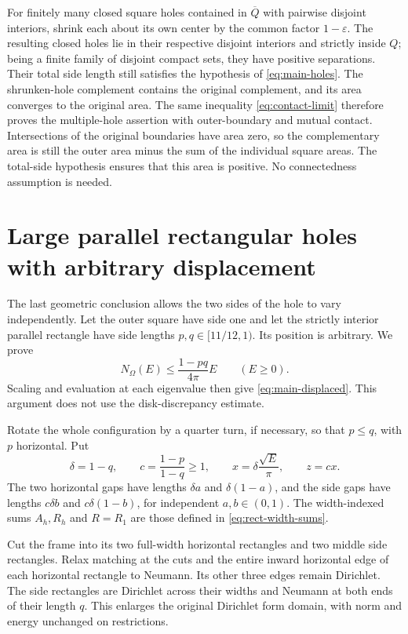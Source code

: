 \documentclass[11pt,reqno]{amsart}
\numberwithin{equation}{section}
\newcommand{\Om}{\Omega}
\begin{document}
For finitely many closed square holes contained in $\overline Q$
with pairwise disjoint interiors, shrink each about its own center
by the common factor $1-\varepsilon$. The resulting closed holes
lie in their respective disjoint interiors and strictly inside $Q$;
being a finite family of disjoint compact sets, they have positive
separations. Their total side length still satisfies the hypothesis
of \eqref{eq:main-holes}. The shrunken-hole complement contains the
original complement, and its area converges to the original area.
The same inequality \eqref{eq:contact-limit} therefore proves the
multiple-hole assertion with outer-boundary and mutual contact.
Intersections of the original boundaries have area zero, so the
complementary area is still the outer area minus the sum of the
individual square areas. The total-side hypothesis ensures that this
area is positive. No connectedness assumption is needed.


\section{Large parallel rectangular holes with arbitrary displacement}\label{sec:displaced}

The last geometric conclusion allows the two sides of the hole to vary
independently. Let the outer square have side one and let the strictly
interior parallel rectangle have side lengths $p,q\in[11/12,1)$.
Its position is arbitrary. We prove
\[
 N_\Om(E)\le\frac{1-pq}{4\pi}E\qquad(E\ge0).
\]
Scaling and evaluation at each eigenvalue then give
\eqref{eq:main-displaced}. This argument does not use the
disk-discrepancy estimate.

Rotate the whole configuration by a quarter turn, if necessary, so
that $p\le q$, with $p$ horizontal. Put
\[
 \delta=1-q,\qquad c=\frac{1-p}{1-q}\ge1,
 \qquad x=\delta\frac{\sqrt E}{\pi},\qquad z=cx.
\]
The two horizontal gaps have lengths $\delta a$ and
$\delta(1-a)$, and the side gaps have lengths $c\delta b$ and
$c\delta(1-b)$, for independent $a,b\in(0,1)$. The width-indexed sums $A_h,R_h$ and $R=R_1$ are those
defined in \eqref{eq:rect-width-sums}.

Cut the frame into its two full-width horizontal rectangles and
two middle side rectangles. Relax matching at the cuts and the
entire inward horizontal edge of each horizontal rectangle to
Neumann. Its other three edges remain Dirichlet. The side
rectangles are Dirichlet across their widths and Neumann at both
ends of their length $q$. This enlarges the original Dirichlet
form domain, with norm and energy unchanged on restrictions.
\end{document}
